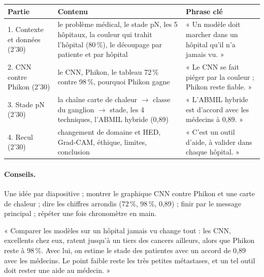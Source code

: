 \documentclass[11pt,a4paper]{article}
\begin{document}
\begin{table}[H]
\centering\small
\begin{tabularx}{\textwidth}{lXX}
\toprule
\textbf{Partie} & \textbf{Contenu} & \textbf{Phrase clé} \\
\midrule
1. Contexte et données (2'30) & le problème médical, le stade pN, les 5 hôpitaux, la couleur qui trahit l'hôpital (80\,\%),
le découpage par patiente et par hôpital & « Un modèle doit marcher dans un hôpital qu'il n'a jamais vu. » \\
2. CNN contre Phikon (2'30) & le CNN, Phikon, le tableau 72\,\% contre 98\,\%, pourquoi Phikon gagne & « Le CNN se fait piéger par la
couleur ; Phikon reste fiable. » \\
3. Stade pN (2'30) & la chaîne carte de chaleur $\to$ classe du ganglion $\to$ stade, les 4 techniques, l'ABMIL hybride (0,89) &
« L'ABMIL hybride est d'accord avec les médecins à 0,89. » \\
4. Recul (2'30) & changement de domaine et HED, Grad-CAM, éthique, limites, conclusion & « C'est un outil d'aide, à valider dans
chaque hôpital. » \\
\bottomrule
\end{tabularx}
\end{table}

\paragraph{Conseils.} Une idée par diapositive ; montrer le graphique CNN contre Phikon et une carte de chaleur ; dire les chiffres
arrondis (72\,\%, 98\,\%, 0,89) ; finir par le message principal ; répéter une fois chronomètre en main.

\begin{oral}
« Comparer les modèles sur un hôpital jamais vu change tout : les CNN, excellents chez eux, ratent jusqu'à un tiers des cancers
ailleurs, alors que Phikon reste à 98\,\%. Avec lui, on estime le stade des patientes avec un accord de 0,89 avec les médecins. Le
point faible reste les très petites métastases, et un tel outil doit rester une aide au médecin. »
\end{oral}

\end{document}
